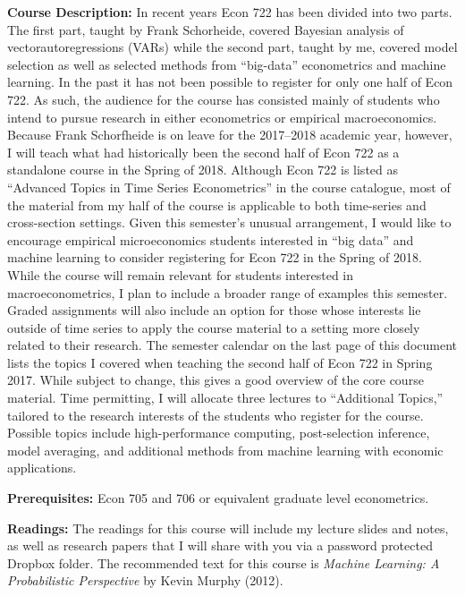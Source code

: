 \documentclass[11pt, letterpaper]{article}
\begin{document}
\noindent \textbf{Course Description:} 
In recent years Econ 722 has been divided into two parts.
The first part, taught by Frank Schorheide, covered Bayesian analysis of vectorautoregressions (VARs) while the second part, taught by me, covered model selection as well as selected methods from ``big-data'' econometrics and machine learning. 
In the past it has not been possible to register for only one half of Econ 722.
As such, the audience for the course has consisted mainly of students who intend to pursue research in either econometrics or empirical macroeconomics. 
Because Frank Schorfheide is on leave for the 2017--2018 academic year, however, I will teach what had historically been the second half of Econ 722 as a standalone course in the Spring of 2018.
Although Econ 722 is listed as ``Advanced Topics in Time Series Econometrics'' in the course catalogue, most of the material from my half of the course is applicable to both time-series and cross-section settings. 
Given this semester's unusual arrangement, I would like to encourage empirical microeconomics students interested in ``big data'' and machine learning to consider registering for Econ 722 in the Spring of 2018.
While the course will remain relevant for students interested in macroeconometrics, I plan to include a broader range of examples this semester.
Graded assignments will also include an option for those whose interests lie outside of time series to apply the course material to a setting more closely related to their research.
The semester calendar on the last page of this document lists the topics I covered when teaching the second half of Econ 722 in Spring 2017.
While subject to change, this gives a good overview of the core course material.
Time permitting, I will allocate three lectures to ``Additional Topics,'' tailored to the research interests of the students who register for the course.
Possible topics include high-performance computing, post-selection inference, model averaging, and additional methods from machine learning with economic applications.

\medskip

\noindent \textbf{Prerequisites:} 
Econ 705 and 706 or equivalent graduate level econometrics. 



\medskip

\noindent \textbf{Readings:} 
The readings for this course will include my lecture slides and notes, as well as research papers that I will share with you via a password protected Dropbox folder.
The recommended text for this course is \emph{Machine Learning: A Probabilistic Perspective} by Kevin Murphy (2012).
\end{document}
